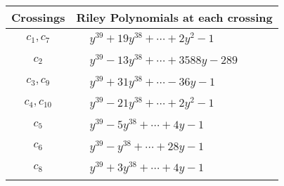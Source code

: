\documentclass[1p]{elsarticle_modified}
\theoremstyle{definition}
\begin{document}
\begin{tabular}{m{50pt}|m{274pt}}
Crossings & \hspace{64pt}Riley Polynomials at each crossing \\
\hline $$\begin{aligned}c_{1},c_{7}\end{aligned}$$&$\begin{aligned}
&y^{39}+19 y^{38}+\cdots+2 y^2-1
\end{aligned}$\\
\hline $$\begin{aligned}c_{2}\end{aligned}$$&$\begin{aligned}
&y^{39}-13 y^{38}+\cdots+3588 y-289
\end{aligned}$\\
\hline $$\begin{aligned}c_{3},c_{9}\end{aligned}$$&$\begin{aligned}
&y^{39}+31 y^{38}+\cdots-36 y-1
\end{aligned}$\\
\hline $$\begin{aligned}c_{4},c_{10}\end{aligned}$$&$\begin{aligned}
&y^{39}-21 y^{38}+\cdots+2 y^2-1
\end{aligned}$\\
\hline $$\begin{aligned}c_{5}\end{aligned}$$&$\begin{aligned}
&y^{39}-5 y^{38}+\cdots+4 y-1
\end{aligned}$\\
\hline $$\begin{aligned}c_{6}\end{aligned}$$&$\begin{aligned}
&y^{39}- y^{38}+\cdots+28 y-1
\end{aligned}$\\
\hline $$\begin{aligned}c_{8}\end{aligned}$$&$\begin{aligned}
&y^{39}+3 y^{38}+\cdots+4 y-1
\end{aligned}$\\
\hline
\end{tabular}
\vskip 2pc
\end{document}
